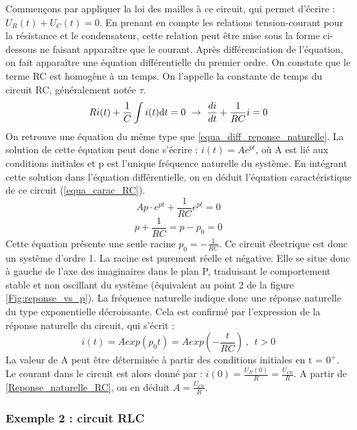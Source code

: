 \documentclass[]{book}
\begin{document}
{	\vspace{1\baselineskip}
	Commençons par appliquer la loi des mailles à ce circuit, qui permet d'écrire : $U_{R}(t)+U_{C}(t)=0.$ En prenant en compte les relations tension-courant pour la résistance et le condensateur, cette relation peut être mise sous la forme ci-dessous ne faisant apparaître que le courant. Après différenciation de l'équation, on fait apparaître une équation différentielle du premier ordre. On constate que le terme RC est homogène à un temps. On l'appelle la constante de temps du circuit RC, généralement notée $\tau$.
	\begin{equation*}
	Ri(t)+\frac{1}{C}\int i(t) \mathrm{d} t=0~\rightarrow ~\frac{di}{dt}+\frac{1}{RC}i = 0
	\end{equation*}
	On retrouve une équation du même type que \ref{equa_diff_reponse_naturelle}. La solution de cette équation peut donc s'écrire : $i(t) = Ae^{pt}$, où A est lié aux conditions initiales et p est l'unique fréquence naturelle du système. En intégrant cette solution dans l'équation différentielle, on en déduit l'équation caractéristique de ce circuit (\ref{equa_carac_RC}).
	\begin{equation*}
	Ap\cdot e^{pt}+\frac{1}{RC} e^{pt}=0
	\end{equation*}
	\begin{equation}\label{equa_carac_RC}
	p+\frac{1}{RC}=p-p_{0}=0
	\end{equation}
	Cette équation présente une seule racine $p_{0} = -\frac{1}{RC}$. Ce circuit électrique est donc un système d'ordre 1. La racine est purement réelle et négative. Elle se situe donc à gauche de l'axe des imaginaires dans le plan P, traduisant le comportement stable et non oscillant du système (équivalent au point 2 de la figure \ref{Fig:reponse_vs_p}). La fréquence naturelle	indique donc une réponse naturelle du type exponentielle décroissante. Cela est confirmé par l'expression de la réponse naturelle du circuit, qui s'écrit :
	\begin{equation}\label{Reponse_naturelle_RC}
	i(t)=Aexp(p_{0}t)=Aexp(-\frac{t}{RC})~,~~t>0
	\end{equation}
	La valeur de A peut être déterminée à partir des conditions initiales en t = $0^{+}$. Le courant dans le circuit est alors donné par : $i(0)=\frac{U_{R}(0)}{R}=\frac{U_{C0}}{R}$. A partir de \ref{Reponse_naturelle_RC}, on en déduit $A=\frac{U_{C0}}{R}$.


	\subsubsection{Exemple 2 : circuit RLC}
	
}
\end{document}
